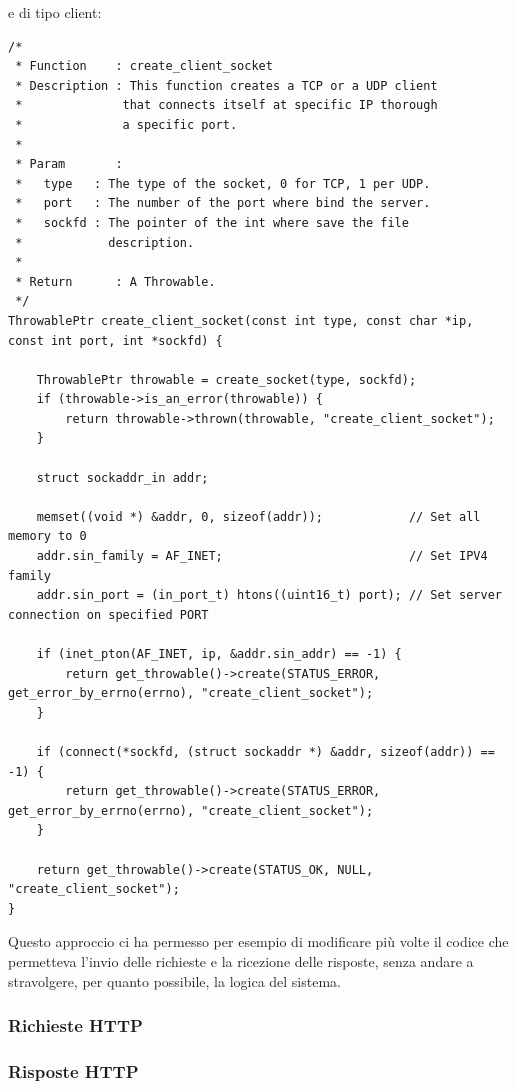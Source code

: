 \documentclass[italian]{tktltiki2}
\begin{document}
e di tipo client:
\begin{lstlisting}
/*
 * Function    : create_client_socket
 * Description : This function creates a TCP or a UDP client
 *              that connects itself at specific IP thorough
 *              a specific port.
 *
 * Param       :
 *   type   : The type of the socket, 0 for TCP, 1 per UDP.
 *   port   : The number of the port where bind the server.
 *   sockfd : The pointer of the int where save the file
 *            description.
 *
 * Return      : A Throwable.
 */
ThrowablePtr create_client_socket(const int type, const char *ip, const int port, int *sockfd) {

    ThrowablePtr throwable = create_socket(type, sockfd);
    if (throwable->is_an_error(throwable)) {
        return throwable->thrown(throwable, "create_client_socket");
    }

    struct sockaddr_in addr;

    memset((void *) &addr, 0, sizeof(addr));            // Set all memory to 0
    addr.sin_family = AF_INET;                          // Set IPV4 family
    addr.sin_port = (in_port_t) htons((uint16_t) port); // Set server connection on specified PORT

    if (inet_pton(AF_INET, ip, &addr.sin_addr) == -1) {
        return get_throwable()->create(STATUS_ERROR, get_error_by_errno(errno), "create_client_socket");
    }

    if (connect(*sockfd, (struct sockaddr *) &addr, sizeof(addr)) == -1) {
        return get_throwable()->create(STATUS_ERROR, get_error_by_errno(errno), "create_client_socket");
    }

    return get_throwable()->create(STATUS_OK, NULL, "create_client_socket");
}
\end{lstlisting}
Questo approccio ci ha permesso per esempio di modificare più volte il codice che permetteva l'invio delle richieste e la ricezione delle risposte, senza andare a stravolgere, per quanto possibile, la logica del sistema.
\subsubsection*{Richieste HTTP}
\subsubsection*{Risposte HTTP}
\end{document}
